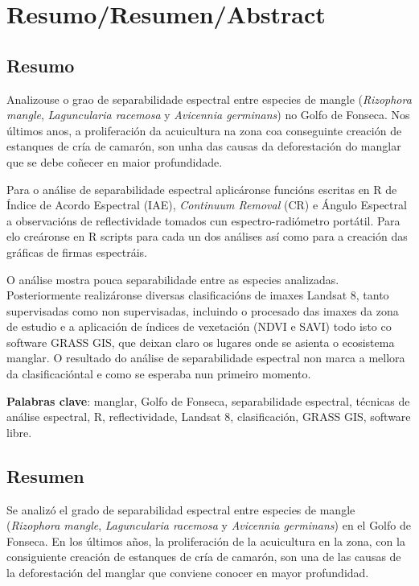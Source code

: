
\chapter*{Resumo/Resumen/Abstract}
\section*{Resumo}
Analizouse o grao de separabilidade espectral entre especies de mangle (\textit{Rizophora mangle}, \textit{Laguncularia racemosa} y \textit{Avicennia germinans}) no Golfo de Fonseca. Nos últimos anos, a proliferación da acuicultura na zona coa conseguinte creación de estanques de cría de camarón, son unha das causas da deforestación do manglar que se debe coñecer en maior profundidade.

Para o análise de separabilidade espectral aplicáronse funcións escritas en R de Índice de Acordo Espectral (IAE), \textit{Continuum Removal} (CR) e Ángulo Espectral a observacións de reflectividade tomados cun espectro-radiómetro portátil. Para elo creáronse en R scripts para cada un dos análises así como para a creación das gráficas de firmas espectráis.

O análise mostra pouca separabilidade entre as especies analizadas. Posteriormente realizáronse diversas clasificacións de imaxes Landsat 8, tanto supervisadas como non supervisadas, incluindo o procesado das imaxes da zona de estudio e a aplicación de índices de vexetación (NDVI e SAVI) todo isto co software GRASS GIS, que deixan claro os lugares onde se asienta o ecosistema manglar. O resultado do análise de separabilidade espectral non marca a mellora da clasificacióntal e como se esperaba nun primeiro momento.

\noindent\textbf{Palabras clave}: manglar, Golfo de Fonseca, separabilidade espectral, técnicas de análise espectral, R, reflectividade, Landsat 8, clasificación, GRASS GIS, software libre.

\section*{Resumen}
Se analizó el grado de separabilidad espectral entre especies de mangle (\textit{Rizophora mangle}, \textit{Laguncularia racemosa} y \textit{Avicennia germinans}) en el Golfo de Fonseca. En los últimos años, la proliferación de la acuicultura en la zona, con la consiguiente creación de estanques de cría de camarón, son una de las causas de la deforestación del manglar que conviene conocer en mayor profundidad.

